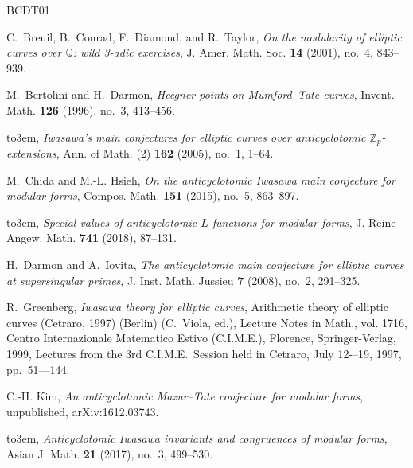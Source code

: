 \documentclass[11pt]{amsart}
\numberwithin{equation}{section}
\theoremstyle{definition}
\begin{document}
\providecommand{\bysame}{\leavevmode\hbox to3em{\hrulefill}\thinspace}
\providecommand{\MR}{\relax\ifhmode\unskip\space\fi MR }
\providecommand{\MRhref}[2]{%
  \href{http://www.ams.org/mathscinet-getitem?mr=#1}{#2}
}
\providecommand{\href}[2]{#2}
\begin{thebibliography}{BCDT01}

C.~Breuil, B.~Conrad, F.~Diamond, and R.~Taylor, \emph{On the modularity of
  elliptic curves over {$\mathbb{Q}$}: wild 3-adic exercises}, J. Amer. Math.
  Soc. \textbf{14} (2001), no.~4, 843--939.

M.~Bertolini and H.~Darmon, \emph{Heegner points on {M}umford--{T}ate curves},
  Invent. Math. \textbf{126} (1996), no.~3, 413--456.

\bysame, \emph{Iwasawa's main conjectures for elliptic curves over
  anticyclotomic {$\mathbb{Z}_p$}-extensions}, Ann. of Math. (2) \textbf{162}
  (2005), no.~1, 1--64.

M.~Chida and M.-L. Hsieh, \emph{On the anticyclotomic {I}wasawa main conjecture
  for modular forms}, Compos. Math. \textbf{151} (2015), no.~5, 863--897.

\bysame, \emph{Special values of anticyclotomic {$L$}-functions for modular
  forms}, J. Reine Angew. Math. \textbf{741} (2018), 87--131.

H.~Darmon and A.~Iovita, \emph{The anticyclotomic main conjecture for elliptic
  curves at supersingular primes}, J. Inst. Math. Jussieu \textbf{7} (2008),
  no.~2, 291--325.

R.~Greenberg, \emph{Iwasawa theory for elliptic curves}, Arithmetic theory of
  elliptic curves ({C}etraro, 1997) (Berlin) (C.~Viola, ed.), Lecture Notes in
  Math., vol. 1716, Centro Internazionale Matematico Estivo (C.I.M.E.),
  Florence, Springer-Verlag, 1999, Lectures from the 3rd {C.I.M.E.}~{S}ession
  held in {C}etraro, {J}uly 12-{--}19, 1997, pp.~51{--}--144.

C.-H. Kim, \emph{An anticyclotomic {M}azur--{T}ate conjecture for modular
  forms}, unpublished,
  \href{https://arxiv.org/abs/1612.03743}{arXiv:1612.03743}.

\bysame, \emph{Anticyclotomic {I}wasawa invariants and congruences of modular
  forms}, Asian J. Math. \textbf{21} (2017), no.~3, 499--530.


\end{thebibliography}
\end{document}
